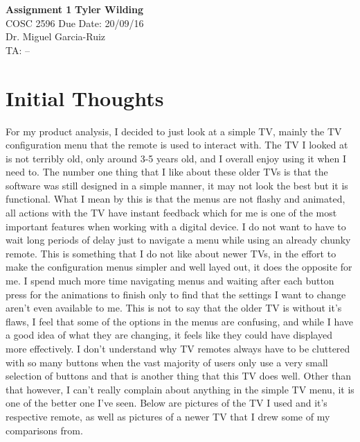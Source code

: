 \documentclass[a4paper, 11pt]{article}
\begin{document}
\noindent
\large\textbf{Assignment 1} \hfill \textbf{Tyler Wilding} \\
\normalsize COSC 2596 \hfill Due Date: 20/09/16 \\
Dr. Miguel Garcia-Ruiz \hfill \\
TA: -- \hfill 

\section*{Initial Thoughts}
For my product analysis, I decided to just look at a simple TV, mainly the TV configuration menu that the remote is used to interact with.  The TV I looked at is not terribly old, only around 3-5 years old, and I overall enjoy using it when I need to.  The number one thing that I like about these older TVs is that the software was still designed in a simple manner, it may not look the best but it is functional.  What I mean by this is that the menus are not flashy and animated, all actions with the TV have instant feedback which for me is one of the most important features when working with a digital device.  I do not want to have to wait long periods of delay just to navigate a menu while using an already chunky remote.  This is something that I do not like about newer TVs, in the effort to make the configuration menus simpler and well layed out, it does the opposite for me.  I spend much more time navigating menus and waiting after each button press for the animations to finish only to find that the settings I want to change aren't even available to me.  This is not to say that the older TV is without it's flaws, I feel that some of the options in the menus are confusing, and while I have a good idea of what they are changing, it feels like they could have displayed more effectively.  I don't understand why TV remotes always have to be cluttered with so many buttons when the vast majority of users only use a very small selection of buttons and that is another thing that this TV does well.  Other than that however, I can't really complain about anything in the simple TV menu, it is one of the better one I've seen.  Below are pictures of the TV I used and it's respective remote, as well as pictures of a newer TV that I drew some of my comparisons from.\\
\end{document}
